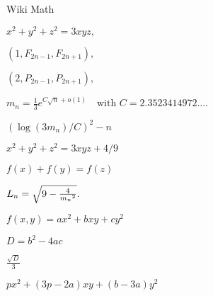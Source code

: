 \documentclass[14pt]{amsart}
\begin{document}
{\Large Wiki Math}

$ x^{2}+y^{2}+z^{2}=3xyz,\,$

$ (1,F_{2n-1},F_{2n+1}),\,$

$ (2,P_{2n-1},P_{2n+1}),\,$

$ m_{n}={\tfrac {1}{3}}e^{C{\sqrt {n}}+o(1)}\quad {\text{with }}C=2.3523414972\ldots .$

$ (\log(3m_{n})/C)^{2}-n$

$ x^{2}+y^{2}+z^{2}=3xyz+4/9$

$ f(x)+f(y)=f(z)$

$ L_{n}={\sqrt {9-{4 \over {m_{n}}^{2}}}}.\,$

$ f(x,y)=ax^{2}+bxy+cy^{2}$

$ D=b^{2}-4ac$

$ {\frac {\sqrt {D}}{3}}$

$ px^{2}+(3p-2a)xy+(b-3a)y^{2}$
\end{document}
